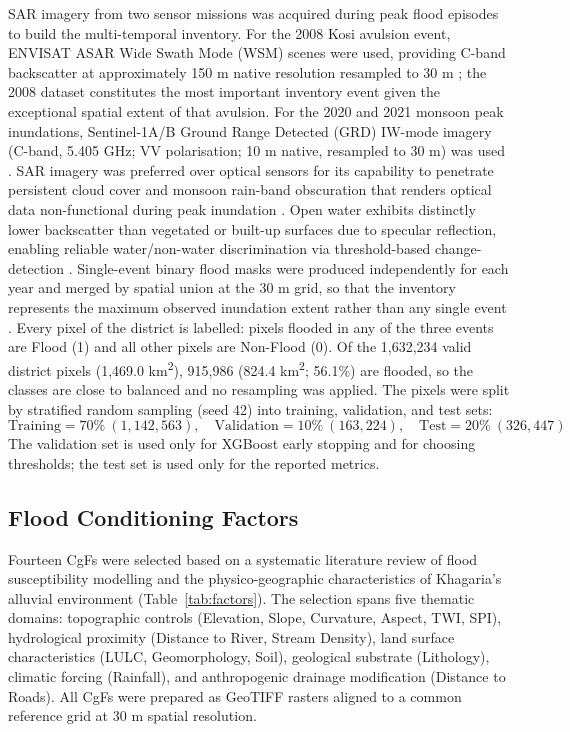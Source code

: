 \documentclass[12pt, a4paper]{article}
\begin{document}
SAR imagery from two sensor missions was acquired during peak flood episodes to build the multi-temporal inventory. For the 2008 Kosi avulsion event, ENVISAT ASAR Wide Swath Mode (WSM) scenes were used, providing C-band backscatter at approximately 150 m native resolution resampled to 30 m \citep{Twele2016}; the 2008 dataset constitutes the most important inventory event given the exceptional spatial extent of that avulsion. For the 2020 and 2021 monsoon peak inundations, Sentinel-1A/B Ground Range Detected (GRD) IW-mode imagery (C-band, 5.405 GHz; VV polarisation; 10 m native, resampled to 30 m) was used \citep{DeVries2020, dasgupta2018}. SAR imagery was preferred over optical sensors for its capability to penetrate persistent cloud cover and monsoon rain-band obscuration that renders optical data non-functional during peak inundation \citep{srivastava2017}. Open water exhibits distinctly lower backscatter than vegetated or built-up surfaces due to specular reflection, enabling reliable water/non-water discrimination via threshold-based change-detection \citep{bauer2015, Twele2016}. Single-event binary flood masks were produced independently for each year and merged by spatial union at the 30 m grid, so that the inventory represents the maximum observed inundation extent rather than any single event \citep{Arora2022SERRA}. Every pixel of the district is labelled: pixels flooded in any of the three events are Flood (1) and all other pixels are Non-Flood (0). Of the 1,632,234 valid district pixels (1,469.0 km\textsuperscript{2}), 915,986 (824.4 km\textsuperscript{2}; 56.1\%) are flooded, so the classes are close to balanced and no resampling was applied. The pixels were split by stratified random sampling (seed 42) into training, validation, and test sets:
\begin{equation}
    \text{Training} = 70\%\ (1{,}142{,}563),\quad \text{Validation} = 10\%\ (163{,}224),\quad \text{Test} = 20\%\ (326{,}447)
\end{equation}
The validation set is used only for XGBoost early stopping and for choosing thresholds; the test set is used only for the reported metrics.

\subsection{Flood Conditioning Factors}

Fourteen CgFs were selected based on a systematic literature review of flood susceptibility modelling \citep{khosravi2018, tehrany2019, rahmati2016, Costache2022, Pourghasemi2020, Pandey2021FrontEarth, Arora2022SERRA} and the physico-geographic characteristics of Khagaria's alluvial environment (Table~\ref{tab:factors}). The selection spans five thematic domains: topographic controls (Elevation, Slope, Curvature, Aspect, TWI, SPI), hydrological proximity (Distance to River, Stream Density), land surface characteristics (LULC, Geomorphology, Soil), geological substrate (Lithology), climatic forcing (Rainfall), and anthropogenic drainage modification (Distance to Roads). All CgFs were prepared as GeoTIFF rasters aligned to a common reference grid at 30 m spatial resolution.
\end{document}
